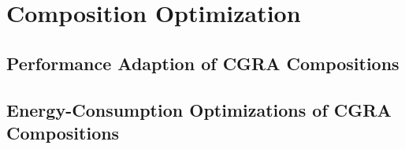 \chapter{Composition Optimization}
\label{cha:compositionOptimization}

\section{Performance Adaption of CGRA Compositions}
\label{sec:performanceComposition}

\section{Energy-Consumption Optimizations of CGRA Compositions}
\label{sec:energyComposition}


